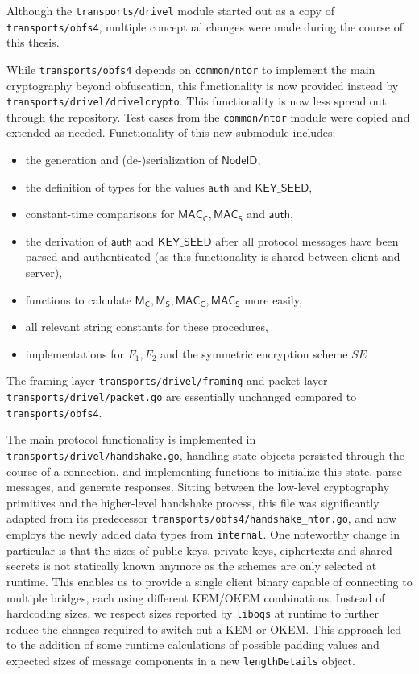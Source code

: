 Although the \texttt{transports/drivel} module started out as a copy of \texttt{transports/obfs4}, multiple conceptual changes were made during the course of this thesis.

While \texttt{transports/obfs4} depends on \texttt{common/ntor} to implement the main cryptography beyond obfuscation, this functionality is now provided instead by \texttt{transports/drivel/drivelcrypto}. This functionality is now less spread out through the repository. Test cases from the \texttt{common/ntor} module were copied and extended as needed.
Functionality of this new submodule includes:
\begin{itemize}
    \item the generation and (de-)serialization of $\mathsf{NodeID}$,
    \item the definition of types for the values $\mathsf{auth}$ and $\mathsf{KEY\_SEED}$,
    \item constant-time comparisons for $\mathsf{MAC_C}, \mathsf{MAC_S}$ and $\mathsf{auth}$,
    \item the derivation of $\mathsf{auth}$ and $\mathsf{KEY\_SEED}$ after all protocol messages have been parsed and authenticated (as this functionality is shared between client and server),
    \item functions to calculate $\mathsf{M_C}, \mathsf{M_S}, \mathsf{MAC_C}, \mathsf{MAC_S}$ more easily,
    \item all relevant string constants for these procedures,
    \item implementations for $F_1, F_2$ and the symmetric encryption scheme $SE$
\end{itemize}

The framing layer \texttt{transports/drivel/framing} and packet layer \texttt{transports/drivel/packet.go} are essentially unchanged compared to \texttt{transports/obfs4}.

The main protocol functionality is implemented in \texttt{transports/drivel/handshake.go}, handling state objects persisted through the course of a connection, and implementing functions to initialize this state, parse messages, and generate responses.
Sitting between the low-level cryptography primitives and the higher-level handshake process, this file was significantly adapted from its predecessor \texttt{transports/obfs4/handshake\_ntor.go}, and now employs the newly added data types from \texttt{internal}.
One noteworthy change in particular is that the sizes of public keys, private keys, ciphertexts and shared secrets is not statically known anymore as the schemes are only selected at runtime. This enables us to provide a single client binary capable of connecting to multiple bridges, each using different KEM/OKEM combinations. Instead of hardcoding sizes, we respect sizes reported by \texttt{liboqs} at runtime to further reduce the changes required to switch out a KEM or OKEM.
This approach led to the addition of some runtime calculations of possible padding values and expected sizes of message components in a new \texttt{lengthDetails} object.

